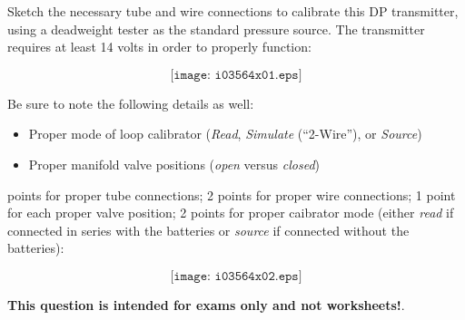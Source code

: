 

Sketch the necessary tube and wire connections to calibrate this DP transmitter, using a deadweight tester as the standard pressure source.  The transmitter requires at least 14 volts in order to properly function:

\vskip 10pt

$$\texttt{[image: i03564x01.eps]}$$

Be sure to note the following details as well:

\begin{itemize}
\item{} Proper mode of loop calibrator ({\it Read}, {\it Simulate} (``2-Wire''), or {\it Source})
\item{} Proper manifold valve positions ({\it open} versus {\it closed})
\end{itemize}







 points for proper tube connections; 2 points for proper wire connections; 1 point for each proper valve position; 2 points for proper caibrator mode (either {\it read} if connected in series with the batteries or {\it source} if connected without the batteries):

$$\texttt{[image: i03564x02.eps]}$$







{\bf This question is intended for exams only and not worksheets!}.



